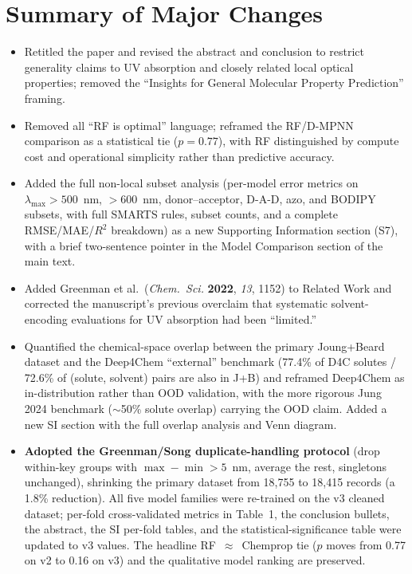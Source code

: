 \documentclass[11pt]{article}
\begin{document}
\section*{Summary of Major Changes}
\begin{itemize}[leftmargin=2em]
  \item Retitled the paper and revised the abstract and conclusion to restrict generality claims to UV absorption and closely related local optical properties; removed the ``Insights for General Molecular Property Prediction'' framing.
  \item Removed all ``RF is optimal'' language; reframed the RF/D-MPNN comparison as a statistical tie ($p = 0.77$), with RF distinguished by compute cost and operational simplicity rather than predictive accuracy.
  \item Added the full non-local subset analysis (per-model error metrics on $\lambda_{\max} > 500$~nm, $> 600$~nm, donor--acceptor, D-A-D, azo, and BODIPY subsets, with full SMARTS rules, subset counts, and a complete RMSE/MAE/$R^2$ breakdown) as a new Supporting Information section (S7), with a brief two-sentence pointer in the Model Comparison section of the main text.
  \item Added Greenman et al.\ (\textit{Chem.\ Sci.} \textbf{2022}, \textit{13}, 1152) to Related Work and corrected the manuscript's previous overclaim that systematic solvent-encoding evaluations for UV absorption had been ``limited.''
  \item Quantified the chemical-space overlap between the primary Joung+Beard dataset and the Deep4Chem ``external'' benchmark (77.4\% of D4C solutes / 72.6\% of (solute, solvent) pairs are also in J+B) and reframed Deep4Chem as in-distribution rather than OOD validation, with the more rigorous Jung 2024 benchmark ($\sim$50\% solute overlap) carrying the OOD claim. Added a new SI section with the full overlap analysis and Venn diagram.
  \item \textbf{Adopted the Greenman/Song duplicate-handling protocol} (drop within-key groups with $\max - \min > 5$~nm, average the rest, singletons unchanged), shrinking the primary dataset from 18{,}755 to 18{,}415 records (a 1.8\% reduction). All five model families were re-trained on the v3 cleaned dataset; per-fold cross-validated metrics in Table~1, the conclusion bullets, the abstract, the SI per-fold tables, and the statistical-significance table were updated to v3 values. The headline RF~$\approx$~Chemprop tie ($p$ moves from 0.77 on v2 to 0.16 on v3) and the qualitative model ranking are preserved.

\end{itemize}
\end{document}
